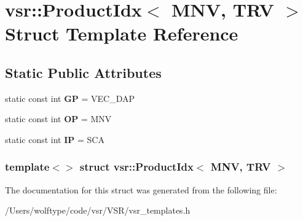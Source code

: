 \hypertarget{structvsr_1_1_product_idx_3_01_m_n_v_00_01_t_r_v_01_4}{\section{vsr\-:\-:Product\-Idx$<$ M\-N\-V, T\-R\-V $>$ Struct Template Reference}
\label{structvsr_1_1_product_idx_3_01_m_n_v_00_01_t_r_v_01_4}
}
\subsection*{Static Public Attributes}
\begin{DoxyCompactItemize}
\item 
\hypertarget{structvsr_1_1_product_idx_3_01_m_n_v_00_01_t_r_v_01_4_a89c5e9af54e36899ceaeedf697c6db69}{static const int {\bfseries G\-P} = V\-E\-C\-\_\-\-D\-A\-P}\label{structvsr_1_1_product_idx_3_01_m_n_v_00_01_t_r_v_01_4_a89c5e9af54e36899ceaeedf697c6db69}

\item 
\hypertarget{structvsr_1_1_product_idx_3_01_m_n_v_00_01_t_r_v_01_4_a5252670eb2253d28af61934859be14c9}{static const int {\bfseries O\-P} = M\-N\-V}\label{structvsr_1_1_product_idx_3_01_m_n_v_00_01_t_r_v_01_4_a5252670eb2253d28af61934859be14c9}

\item 
\hypertarget{structvsr_1_1_product_idx_3_01_m_n_v_00_01_t_r_v_01_4_afe1ea6abbb6de239cd3daff1c792b6ca}{static const int {\bfseries I\-P} = S\-C\-A}\label{structvsr_1_1_product_idx_3_01_m_n_v_00_01_t_r_v_01_4_afe1ea6abbb6de239cd3daff1c792b6ca}

\end{DoxyCompactItemize}
\subsubsection*{template$<$$>$ struct vsr\-::\-Product\-Idx$<$ M\-N\-V, T\-R\-V $>$}



The documentation for this struct was generated from the following file\-:\begin{DoxyCompactItemize}
\item 
/\-Users/wolftype/code/vsr/\-V\-S\-R/vsr\-\_\-templates.\-h\end{DoxyCompactItemize}
